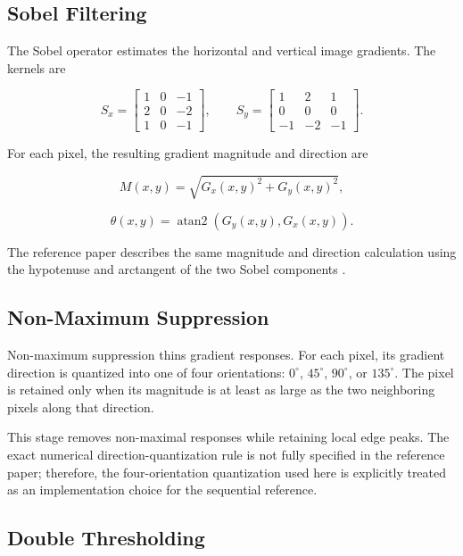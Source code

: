 \documentclass[conference]{IEEEtran}
\begin{document}
\subsection{Sobel Filtering}

The Sobel operator estimates the horizontal and vertical image gradients.
The kernels are

\begin{equation}
S_x =
\begin{bmatrix}
1&0&-1\\
2&0&-2\\
1&0&-1
\end{bmatrix},
\qquad
S_y =
\begin{bmatrix}
1&2&1\\
0&0&0\\
-1&-2&-1
\end{bmatrix}.
\end{equation}

For each pixel, the resulting gradient magnitude and direction are

\begin{equation}
M(x,y)=\sqrt{G_x(x,y)^2+G_y(x,y)^2},
\end{equation}

\begin{equation}
\theta(x,y)=\operatorname{atan2}(G_y(x,y),G_x(x,y)).
\end{equation}

The reference paper describes the same magnitude and direction calculation
using the hypotenuse and arctangent of the two Sobel components
\cite{horvath2023}.

\subsection{Non-Maximum Suppression}

Non-maximum suppression thins gradient responses. For each pixel, its
gradient direction is quantized into one of four orientations:
$0^\circ$, $45^\circ$, $90^\circ$, or $135^\circ$. The pixel is retained
only when its magnitude is at least as large as the two neighboring pixels
along that direction.

This stage removes non-maximal responses while retaining local edge peaks.
The exact numerical direction-quantization rule is not fully specified in
the reference paper; therefore, the four-orientation quantization used here
is explicitly treated as an implementation choice for the sequential
reference.

\subsection{Double Thresholding}
\end{document}
